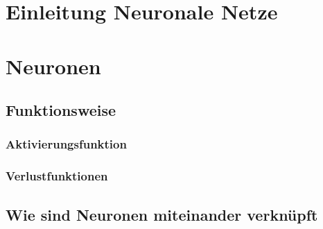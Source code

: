 \newpage
\thispagestyle{empty}
\section{Einleitung Neuronale Netze}\label{sec:einleitung_nn}   

\vspace{1cm}




\section{Neuronen}\label{sec:neuronen}
  
\subsection{Funktionsweise}\label{subsec:neuronen:funktionsweise}
  
 
\subsubsection{Aktivierungsfunktion}\label{subsec:neuronen:aktivierungsfunktion}
   

\subsubsection{Verlustfunktionen}




\subsection{Wie sind Neuronen miteinander verknüpft}\label{subsec:neuronen:verknuepfung_neuronen}  
